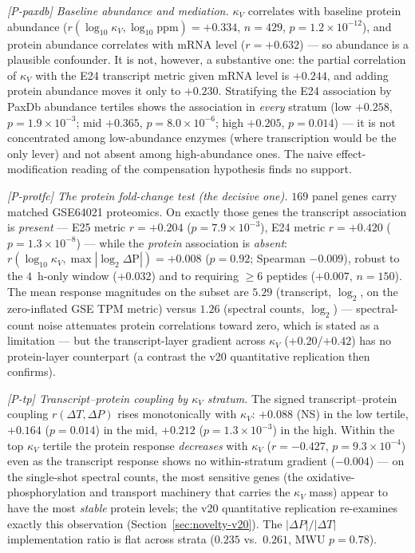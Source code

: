 \documentclass[11pt,a4paper]{article}
\theoremstyle{plain}
\theoremstyle{definition}
\theoremstyle{remark}
\begin{document}
\emph{[P-paxdb] Baseline abundance and mediation.} $\kappa_V$
correlates with baseline protein abundance ($r(\log_{10}\kappa_V,
\log_{10}\mathrm{ppm}) = +0.334$, $n = 429$, $p = 1.2 \times
10^{-12}$), and protein abundance correlates with mRNA level
($r = +0.632$) --- so abundance is a plausible confounder. It is
not, however, a substantive one: the partial correlation of $\kappa_V$
with the E24 transcript metric given mRNA level is $+0.244$, and
adding protein abundance moves it only to $+0.230$. Stratifying the
E24 association by PaxDb abundance tertiles shows the association in
\emph{every} stratum (low $+0.258$, $p = 1.9 \times 10^{-3}$; mid
$+0.365$, $p = 8.0 \times 10^{-6}$; high $+0.205$, $p = 0.014$) ---
it is not concentrated among low-abundance enzymes (where
transcription would be the only lever) and not absent among
high-abundance ones. The naive effect-modification reading of the
compensation hypothesis finds no support.

\emph{[P-protfc] The protein fold-change test (the decisive one).}
$169$ panel genes carry matched GSE64021 proteomics. On exactly
those genes the transcript association is \emph{present} --- E25
metric $r = +0.204$ ($p = 7.9 \times 10^{-3}$), E24 metric
$r = +0.420$ ($p = 1.3 \times 10^{-8}$) --- while the
\emph{protein} association is \emph{absent}: $r(\log_{10}\kappa_V,
\max|\log_2 \Delta\mathrm{P}|) = +0.008$ ($p = 0.92$; Spearman
$-0.009$), robust to the $4$~h-only window ($+0.032$) and to
requiring $\geq 6$ peptides ($+0.007$, $n = 150$). The mean response
magnitudes on the subset are $5.29$ (transcript, $\log_2$, on the
zero-inflated GSE TPM metric) versus $1.26$ (spectral counts,
$\log_2$) --- spectral-count noise attenuates protein correlations
toward zero, which is stated as a limitation --- but the
transcript-layer gradient across $\kappa_V$ ($+0.20$/$+0.42$) has
no protein-layer counterpart (a contrast the v20 quantitative
replication then confirms).

\emph{[P-tp] Transcript--protein coupling by $\kappa_V$ stratum.}
The signed transcript--protein coupling $r(\Delta T, \Delta P)$
rises monotonically with $\kappa_V$: $+0.088$ (NS) in the low
tertile, $+0.164$ ($p = 0.014$) in the mid, $+0.212$
($p = 1.3 \times 10^{-3}$) in the high. Within the top $\kappa_V$
tertile the protein response \emph{decreases} with $\kappa_V$
($r = -0.427$, $p = 9.3 \times 10^{-4}$) even as the transcript
response shows no within-stratum gradient ($-0.004$) --- on the
single-shot spectral counts, the most sensitive genes (the
oxidative-phosphorylation and transport machinery that carries the
$\kappa_V$ mass) appear to have the most \emph{stable} protein
levels; the v20 quantitative replication re-examines exactly this
observation (Section~\ref{sec:novelty-v20}). The $|\Delta P|/|\Delta T|$
implementation ratio is flat across strata ($0.235$ vs.\ $0.261$,
MWU $p = 0.78$).
\end{document}
